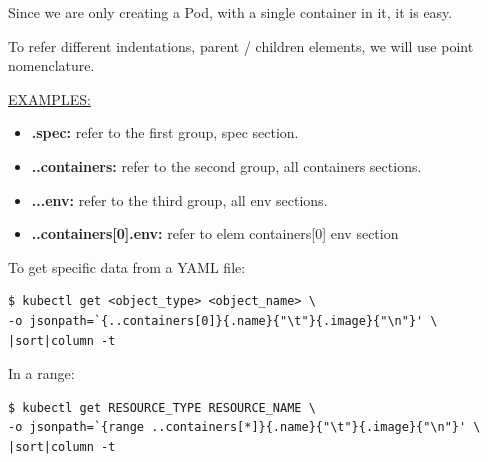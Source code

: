 \documentclass{article}
\newenvironment{blocktemplateI}[1]{%
    \tcolorbox[beamer,%
    noparskip,breakable,
    colframe=Violet,%
    colbacklower=Black,%
    title=#1]}%
    {\endtcolorbox}
\newenvironment{codetemplate}[1][]{%
  \mybasecolorbox[#1]
  \itshape
}{%
  \endmybasecolorbox
}
\begin{document}
Since we are only creating a Pod, with a single container in it, it is easy. 

\begin{blocktemplateI}{NOTE}
To refer different indentations, parent / children elements, we will use point nomenclature. 


\underline{EXAMPLES:}

\begin{itemize}
    \item \textbf{.spec:} refer to the first group, spec section.
    \item \textbf{..containers:} refer to the second group, all containers sections.
    \item \textbf{...env:} refer to the third group, all env sections.
    \item \textbf{..containers[0].env:} refer to elem containers[0] env section
\end{itemize}

To get specific data from a YAML file:

\begin{codetemplate}{}
\begin{verbatim}
$ kubectl get <object_type> <object_name> \
-o jsonpath=`{..containers[0]}{.name}{"\t"}{.image}{"\n"}' \
|sort|column -t
\end{verbatim}
\end{codetemplate}

In a range:

\begin{codetemplate}{}
\begin{verbatim}
$ kubectl get RESOURCE_TYPE RESOURCE_NAME \
-o jsonpath=`{range ..containers[*]}{.name}{"\t"}{.image}{"\n"}' \
|sort|column -t
\end{verbatim}
\end{codetemplate}

\end{blocktemplateI}
\end{document}
